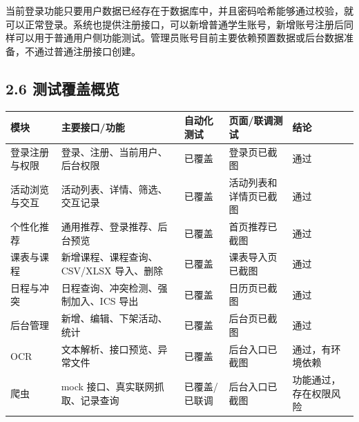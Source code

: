 当前登录功能只要用户数据已经存在于数据库中，并且密码哈希能够通过校验，就可以正常登录。系统也提供注册接口，可以新增普通学生账号，新增账号注册后同样可以用于普通用户侧功能测试。管理员账号目前主要依赖预置数据或后台数据准备，不通过普通注册接口创建。

\subsection{2.6
测试覆盖概览}\label{ux6d4bux8bd5ux8986ux76d6ux6982ux89c8}

{\def\LTcaptype{none} %
\begin{longtable}[]{@{}|
  >{\raggedright\arraybackslash}p{}|
  >{\raggedright\arraybackslash}p{}|
  >{\raggedright\arraybackslash}p{}|
  >{\raggedright\arraybackslash}p{}|
  >{\raggedright\arraybackslash}p{}|@{}}
\hline
\rowcolor{gray!12}
\begin{minipage}[b]{\linewidth}\raggedright
\bfseries 模块
\end{minipage} & \begin{minipage}[b]{\linewidth}\raggedright
\bfseries 主要接口/功能
\end{minipage} & \begin{minipage}[b]{\linewidth}\raggedright
\bfseries 自动化测试
\end{minipage} & \begin{minipage}[b]{\linewidth}\raggedright
\bfseries 页面/联调测试
\end{minipage} & \begin{minipage}[b]{\linewidth}\raggedright
\bfseries 结论
\end{minipage} \\
\hline
\endhead
\hline
\endlastfoot
登录注册与权限 & 登录、注册、当前用户、后台权限 & 已覆盖 & 登录页已截图
& 通过 \\
\hline
活动浏览与交互 & 活动列表、详情、筛选、交互记录 & 已覆盖 &
活动列表和详情页已截图 & 通过 \\
\hline
个性化推荐 & 通用推荐、登录推荐、后台预览 & 已覆盖 & 首页推荐已截图 &
通过 \\
\hline
课表与课程 & 新增课程、课程查询、CSV/XLSX 导入、删除 & 已覆盖 &
课表导入页已截图 & 通过 \\
\hline
日程与冲突 & 日程查询、冲突检测、强制加入、ICS 导出 & 已覆盖 &
日历页已截图 & 通过 \\
\hline
后台管理 & 新增、编辑、下架活动、统计 & 已覆盖 & 后台页已截图 & 通过 \\
\hline
OCR & 文本解析、接口预览、异常文件 & 已覆盖 & 后台入口已截图 &
通过，有环境依赖 \\
\hline
爬虫 & mock 接口、真实联网抓取、记录查询 & 已覆盖/已联调 &
后台入口已截图 & 功能通过，存在权限风险 \\
\hline
\end{longtable}
}

